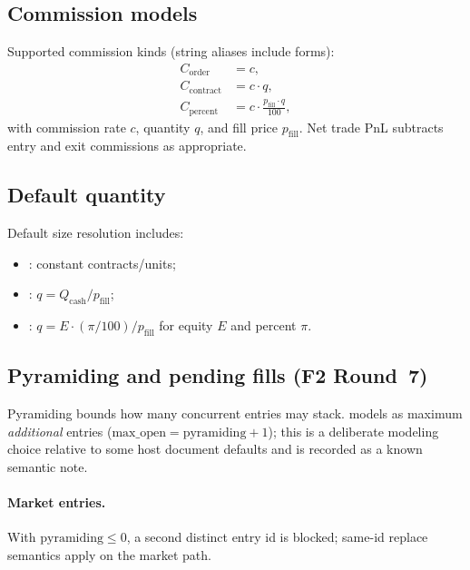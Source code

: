 \documentclass[11pt,a4paper]{article}
\begin{document}
\subsection{Commission models}
Supported commission kinds (string aliases include
 forms):
\begin{align}
  C_{\mathrm{order}} &= c,
  \label{eq:comm-order}\\
  C_{\mathrm{contract}} &= c\cdot q,
  \label{eq:comm-contract}\\
  C_{\mathrm{percent}} &= c\cdot \frac{p_{\mathrm{fill}}\cdot q}{100},
  \label{eq:comm-pct}
\end{align}
with commission rate $c$, quantity $q$, and fill price $p_{\mathrm{fill}}$.
Net trade PnL subtracts entry and exit commissions as appropriate.

\subsection{Default quantity}
Default size resolution includes:
\begin{itemize}[leftmargin=*]
  \item {}: constant contracts/units;
  \item {}: $q = Q_{\mathrm{cash}} / p_{\mathrm{fill}}$;
  \item {}:
    $q = E\cdot (\pi/100) / p_{\mathrm{fill}}$ for equity $E$ and percent $\pi$.
\end{itemize}

\subsection{Pyramiding and pending fills (F2 Round~7)}
\label{sec:f2}
Pyramiding bounds how many concurrent entries may stack.
\pyne{} models  as maximum \emph{additional} entries
($\mathrm{max\_open}=\mathrm{pyramiding}+1$); this is a deliberate modeling
choice relative to some host document defaults and is recorded as a known
semantic note.

\paragraph{Market entries.}
With $\mathrm{pyramiding}\le 0$, a second distinct entry id is blocked; same-id
replace semantics apply on the market path.
\end{document}
